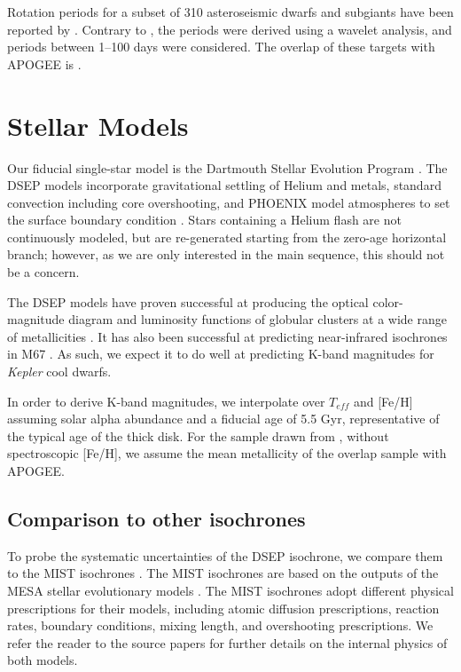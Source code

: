 \documentclass[manuscript]{aastex6}
\newcommand{\Kepler}{\mbox{\textit{Kepler}}}
\newcommand{\Teff}{\ensuremath{T_{eff}}}
\newcommand{\gvs}{\authorcomment1}
\begin{document}
Rotation periods for a subset of 310 asteroseismic dwarfs and subgiants have been reported 
by \citet{Garcia14}. Contrary to \citet{McQuillan14}, the \citet{Garcia14}
periods were derived using a wavelet analysis, and periods between 1--100 days
were considered. The overlap of these targets with APOGEE is \gvs{NUM}.

\section{Stellar Models}

Our fiducial single-star model is the Dartmouth Stellar Evolution Program
\citep[DSEP]{Dotter08}. The DSEP models incorporate gravitational settling of
Helium and metals, standard convection including core overshooting, and PHOENIX
model atmospheres to set the surface boundary condition \citep{Hauschildt99a,
Hauschildt99b}. Stars containing a Helium flash are not continuously modeled,
but are re-generated starting from the zero-age horizontal branch; however, as
we are only interested in the main sequence, this should not be a
concern\citep{Dotter08}.

The DSEP models have proven successful at producing the optical color-magnitude
diagram and luminosity functions of globular clusters at a wide range of
metallicities \citep{Dotter07}. It has also been successful at predicting
near-infrared isochrones in M67 \citep{Sarajedini09}. As such, we expect it to
do well at predicting K-band magnitudes for \Kepler{} cool dwarfs.

In order to derive K-band magnitudes, we interpolate over \Teff{} and [Fe/H]
assuming solar alpha abundance and a fiducial age of 5.5 Gyr, representative
of the typical age of the thick disk. For the sample drawn from
\citet{McQuillan14}, without spectroscopic [Fe/H], we assume the mean
metallicity of the overlap sample with APOGEE\@.

\subsection{Comparison to other isochrones}

To probe the systematic uncertainties of the DSEP isochrone, we compare them to
the MIST isochrones \citep{Dotter16, Choi16}. The MIST isochrones are based on 
the outputs of the MESA stellar evolutionary models \citep{Paxton11, Paxton13, 
Paxton15}. The MIST isochrones adopt different physical prescriptions for their
models, including atomic diffusion prescriptions, reaction rates, boundary
conditions, mixing length, and overshooting prescriptions. We refer the reader
to the source papers for further details on the internal physics of both
models.
\end{document}
